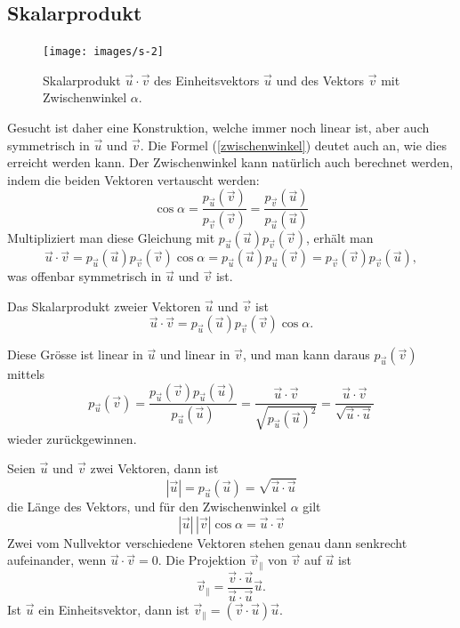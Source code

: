 \subsection{Skalarprodukt}
\begin{figure}
\begin{center}
\texttt{[image: images/s-2]}
\end{center}
\caption{Skalarprodukt $\vec u\cdot \vec v$ des Einheitsvektors $\vec u$
und des Vektors $\vec v$ mit Zwischenwinkel
$\alpha$.\label{image-skalarprodukt}}
\end{figure}
Gesucht ist daher eine Konstruktion, welche immer noch linear ist,
aber auch symmetrisch in $\vec u$ und $\vec v$.
Die Formel (\ref{zwischenwinkel}) deutet auch an, wie dies erreicht
werden kann.
Der Zwischenwinkel kann natürlich auch berechnet werden,
indem die beiden Vektoren vertauscht werden:
\[
\cos \alpha
=
\frac{p_{\vec u}(\vec v)}{p_{\vec v}(\vec v)}
=
\frac{p_{\vec v}(\vec u)}{p_{\vec u}(\vec u)}
\]
Multipliziert man diese Gleichung mit
$
p_{\vec u}(\vec u)
p_{\vec v}(\vec v)
$, erhält man
\[
\vec u\cdot\vec v
=
p_{\vec u}(\vec u)
p_{\vec v}(\vec v)
\cos\alpha =
p_{\vec u}(\vec u)p_{\vec u}(\vec v)
=
p_{\vec v}(\vec v)p_{\vec v}(\vec u),
\]
was offenbar symmetrisch in $\vec u$ und $\vec v$ ist.

\begin{definition}Das Skalarprodukt zweier Vektoren $\vec u$ und
$\vec v$ ist
\[
\vec u\cdot\vec v
=
p_{\vec u}(\vec u)
p_{\vec v}(\vec v)
\cos\alpha.
\]
\end{definition}
Diese Grösse ist linear in $\vec u$ und linear in $\vec v$, und man kann
daraus $p_{\vec u}(\vec v)$ mittels
\[
p_{\vec u}(\vec v)
=
\frac{p_{\vec u}(\vec v)p_{\vec u}(\vec u)}{p_{\vec u}(\vec u)}
=
\frac{\vec u\cdot\vec v}{\sqrt{p_{\vec u}(\vec u)^2}}
=
\frac{\vec u\cdot\vec v}{\sqrt{\vec u\cdot \vec u}}
\]
wieder zurückgewinnen.

\begin{satz}
Seien $\vec u$ und $\vec v$ zwei Vektoren, dann ist
\[
|\vec u|=p_{\vec u}(\vec u)=\sqrt{\vec u\cdot\vec u}
\]
die Länge des Vektors, und für den Zwischenwinkel $\alpha$ gilt
\[
|\vec u|\,|\vec v|\cos\alpha=\vec u\cdot\vec v
\]
Zwei vom Nullvektor verschiedene Vektoren  stehen genau dann senkrecht
aufeinander, wenn $\vec u\cdot\vec v=0$.
Die Projektion $\vec v_{\|}$ von $\vec v$ auf $\vec u$ ist
\[
\vec v_{\|}=\frac{\vec v\cdot\vec u}{\vec u\cdot\vec u}\vec u.
\]
Ist $\vec u$ ein Einheitsvektor, dann ist $\vec v_{\|}=(\vec v\cdot \vec u)\vec u$.
\end{satz}

